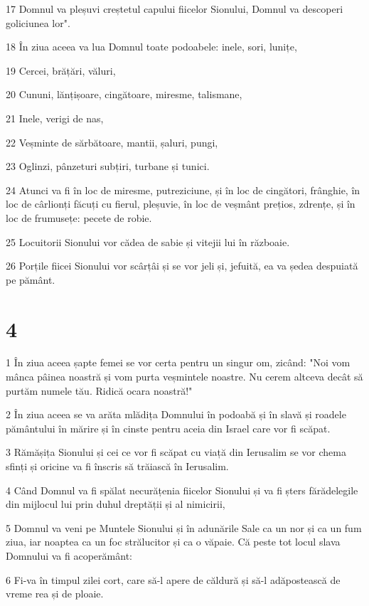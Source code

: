 \par 17 Domnul va pleșuvi creștetul capului fiicelor Sionului, Domnul va descoperi goliciunea lor".
\par 18 În ziua aceea va lua Domnul toate podoabele: inele, sori, lunițe,
\par 19 Cercei, brățări, văluri,
\par 20 Cununi, lănțișoare, cingătoare, miresme, talismane,
\par 21 Inele, verigi de nas,
\par 22 Veșminte de sărbătoare, mantii, șaluri, pungi,
\par 23 Oglinzi, pânzeturi subțiri, turbane și tunici.
\par 24 Atunci va fi în loc de miresme, putreziciune, și în loc de cingători, frânghie, în loc de cârlionți făcuți cu fierul, pleșuvie, în loc de veșmânt prețios, zdrențe, și în loc de frumusețe: pecete de robie.
\par 25 Locuitorii Sionului vor cădea de sabie și vitejii lui în războaie.
\par 26 Porțile fiicei Sionului vor scârțâi și se vor jeli și, jefuită, ea va ședea despuiată pe pământ.

\chapter{4}

\par 1 În ziua aceea șapte femei se vor certa pentru un singur om, zicând: "Noi vom mânca pâinea noastră și vom purta veșmintele noastre. Nu cerem altceva decât să purtăm numele tău. Ridică ocara noastră!"
\par 2 În ziua aceea se va arăta mlădița Domnului în podoabă și în slavă și roadele pământului în mărire și în cinste pentru aceia din Israel care vor fi scăpat.
\par 3 Rămășița Sionului și cei ce vor fi scăpat cu viață din Ierusalim se vor chema sfinți și oricine va fi înscris să trăiască în Ierusalim.
\par 4 Când Domnul va fi spălat necurățenia fiicelor Sionului și va fi șters fărădelegile din mijlocul lui prin duhul dreptății și al nimicirii,
\par 5 Domnul va veni pe Muntele Sionului și în adunările Sale ca un nor și ca un fum ziua, iar noaptea ca un foc strălucitor și ca o văpaie. Că peste tot locul slava Domnului va fi acoperământ:
\par 6 Fi-va în timpul zilei cort, care să-l apere de căldură și să-l adăpostească de vreme rea și de ploaie.

